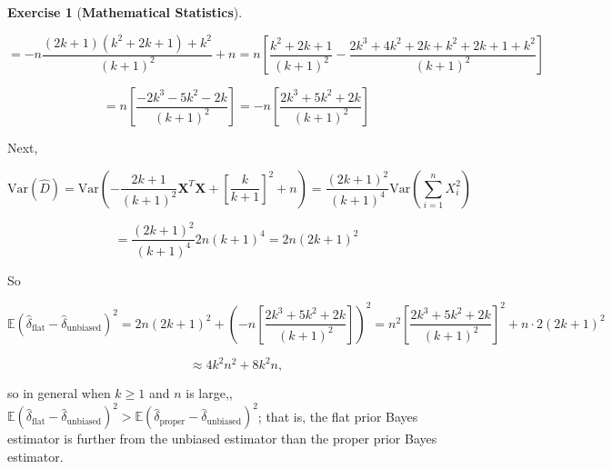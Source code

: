 \documentclass{article}
\theoremstyle{definition}
\newtheorem{exercise}{Exercise}
\theoremstyle{definition}
\theoremstyle{definition}
\theoremstyle{definition}
\theoremstyle{definition}
\newcommand{\E}{\mathbb{E}}
\newcommand{\Var}{\mathrm{Var}}
\begin{document}
\begin{exercise}[\textbf{Mathematical Statistics}]
\begin{enumerate}[(a)]
\[
=  -n \frac{(2k +1)(k^2 + 2k + 1) + k^2}{(k+1)^2}   + n =  n \left[ \frac{k^2 + 2k + 1}{(k+1)^2} - \frac{2k^3 + 4k^2 + 2k + k^2 + 2k + 1 + k^2}{(k+1)^2} \right]
\]

\[
=  n \left[  \frac{-2k^3 -5k^2-2k }{(k+1)^2} \right] =  -n \left[  \frac{2k^3  + 5k^2 + 2k }{(k+1)^2} \right]
\]






Next,

\[
\Var (\hat{D}) = \Var \left( - \frac{2k +1}{(k+1)^2}  \boldsymbol{X}^T\boldsymbol{X} + \left[ \frac{k}{k+1} \right]^2 + n  \right) = \frac{(2k +1)^2}{(k+1)^4}   \Var \left( \sum_{i=1}^n  X_i ^2   \right)
\]

\[
= \frac{(2k +1)^2}{(k+1)^4}   2n(k+1)^4 = 2n (2k+1)^2
\]


So

\[
\E \left( \hat{\delta}_{\text{flat}}  - \hat{\delta}_{\text{unbiased}} \right)^2 =  2n (2k+1)^2 + \left(-n \left[  \frac{2k^3  + 5k^2 + 2k }{(k+1)^2} \right] \right)^2 = n^2  \left[  \frac{2k^3  + 5k^2 + 2k }{(k+1)^2} \right] ^2 + n \cdot 2(2k+1)^2
\]

\[
\approx 4k^2 n^2 + 8k^2 n,
\]

so in general when \(k \geq 1\) and \(n\) is large,, \(\E \left( \hat{\delta}_{\text{flat}}  - \hat{\delta}_{\text{unbiased}} \right)^2 > \E \left( \hat{\delta}_{\text{proper}}  - \hat{\delta}_{\text{unbiased}} \right)^2 \); that is, the flat prior Bayes estimator is further from the unbiased estimator than the proper prior Bayes estimator.

%


\end{enumerate}
\end{exercise}
\end{document}
